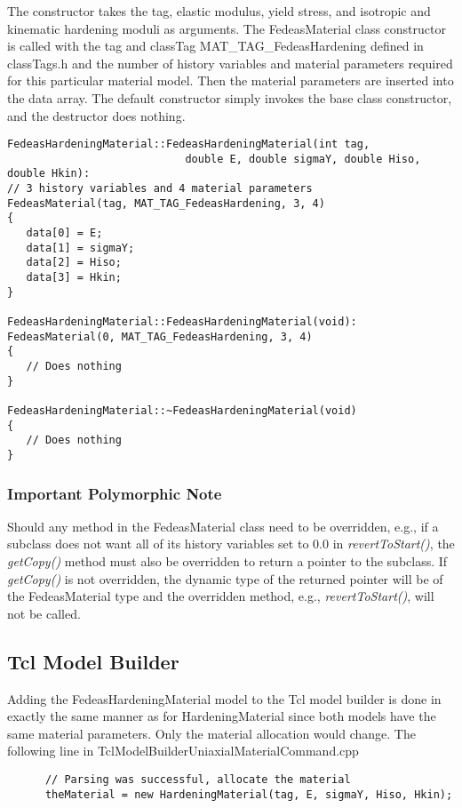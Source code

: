 \documentclass[12pt]{article}
\begin{document}
\noindent The constructor takes the tag, elastic modulus, yield stress, and isotropic and
kinematic hardening moduli as arguments. The FedeasMaterial class constructor is
called with the tag and classTag MAT\_TAG\_FedeasHardening defined in classTags.h
and the number of history variables and material parameters required for this
particular material model. Then the material parameters are inserted into the data array.
The default constructor simply invokes the base class constructor, and the destructor
does nothing.

{\sf\small
\begin{verbatim}
FedeasHardeningMaterial::FedeasHardeningMaterial(int tag,
                            double E, double sigmaY, double Hiso, double Hkin):
// 3 history variables and 4 material parameters
FedeasMaterial(tag, MAT_TAG_FedeasHardening, 3, 4)
{
   data[0] = E;
   data[1] = sigmaY;
   data[2] = Hiso;
   data[3] = Hkin;
}

FedeasHardeningMaterial::FedeasHardeningMaterial(void):
FedeasMaterial(0, MAT_TAG_FedeasHardening, 3, 4)
{
   // Does nothing
}

FedeasHardeningMaterial::~FedeasHardeningMaterial(void)
{
   // Does nothing
}
\end{verbatim}
}

\subsubsection*{Important Polymorphic Note}
Should any method in the FedeasMaterial class need to be overridden, e.g., if a
subclass does not want all of its history variables set to $0.0$ in {\em revertToStart()},
the {\em getCopy()} method must also be overridden to return a pointer to the
subclass. If {\em getCopy()} is not overridden, the dynamic type of the returned
pointer will be of the FedeasMaterial type and the overridden method, e.g.,
{\em revertToStart()}, will not be called.

\subsection{Tcl Model Builder}
Adding the FedeasHardeningMaterial model to the Tcl model builder is done in exactly the same
manner as for HardeningMaterial since both models have the same material parameters. Only the
material allocation would change. The following line in TclModelBuilderUniaxialMaterialCommand.cpp

{\sf\small
\begin{verbatim}
      // Parsing was successful, allocate the material
      theMaterial = new HardeningMaterial(tag, E, sigmaY, Hiso, Hkin); 
\end{verbatim}
}
\end{document}
